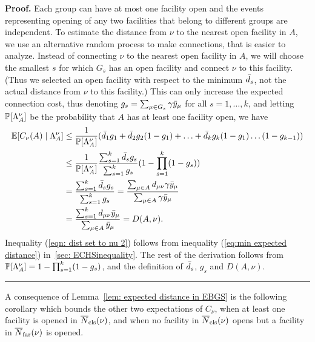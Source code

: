 \documentclass[oneside,final]{ucr}
\newenvironment{proof}[1][Proof]{\textbf{#1.} }{\ \rule{0.5em}{0.5em}}
\begin{document}
\begin{proof}
  Each group can have at most one facility open and the events
  representing opening of any two facilities that belong to different
  groups are independent. To estimate the distance from $\nu$ to the
  nearest open facility in $A$, we use an alternative
  random process to make connections, that is easier to
  analyze. Instead of connecting $\nu$ to the nearest open facility in
  $A$, we will choose the smallest $s$ for which $G_s$ has an open
  facility and connect $\nu$ to this facility. (Thus we selected an
  open facility with respect to the minimum ${\bar d}_s$, not the actual
  distance from $\nu$ to this facility.)  This can only increase the
  expected connection cost, thus denoting $g_s = \sum_{\mu\in G_s}
  \gamma{\bar y}_\mu$ for all $s=1,\ldots,k$, and letting $\mathbb{P}[\Lambda^\nu_A]$
  be the probability that $A$ has at least one facility open, we have
%
\begin{align}
    \mathbb{E}[C_\nu(A) \mid \Lambda^\nu_A] &\leq \frac{1}{\mathbb{P}[\Lambda^\nu_A]} ({\bar d}_1 g_1 +
    {\bar d}_2 g_2 (1 - g_1) + \ldots + {\bar d}_k  g_k(1 -
    g_1)\ldots(1-g_{k-1}))
    \label{eqn: dist set to nu 1}
    \\
    &\leq \frac{1}{\mathbb{P}[\Lambda^\nu_A]} \frac{\sum_{s=1}^k {\bar d}_s
      g_s}{\sum_{s=1}^k  g_s} (1 - \prod_{s=1}^k (1 -  g_s))
    \label{eqn: dist set to nu 2}
    \\
    \notag
    &= \frac{\sum_{s=1}^k {\bar d}_s g_s}{\sum_{s=1}^k g_s} =
    \frac{\sum_{\mu \in A} d_{\mu\nu} \gamma {\bar y}_{\mu}}{\sum_{\mu
        \in A} \gamma {\bar y}_{\mu}}
    \\
    \notag
    &= \frac{\sum_{s=1}^k d_{\mu\nu} {\bar y}_{\mu}}{\sum_{\mu \in A}
      {\bar y}_{\mu}} = D(A, \nu).
\end{align}
%
Inequality (\ref{eqn: dist set to nu 2}) follows from inequality
(\ref{eq:min expected distance}) in~\ref{sec: ECHSinequality}. The rest of the
derivation follows from $\mathbb{P}[\Lambda^\nu_A] = 1 - \prod_{s=1}^k (1 -
g_s)$, and the definition of ${\bar d}_s$, $g_s$ and $D(A,\nu)$.
\end{proof}

A consequence of Lemma~\ref{lem: expected distance in EBGS} is the
following corollary which bounds the other two expectations
of $C_\nu$, when at least one facility is opened in ${\overline{N}}_{{\mbox{\scriptsize\rm cls}}}(\nu)$,
and when no facility in ${\overline{N}}_{{\mbox{\scriptsize\rm cls}}}(\nu)$ opens but a facility in
${\overline{N}}_{{\mbox{\scriptsize\rm far}}}(\nu)$ is opened.

\end{document}

